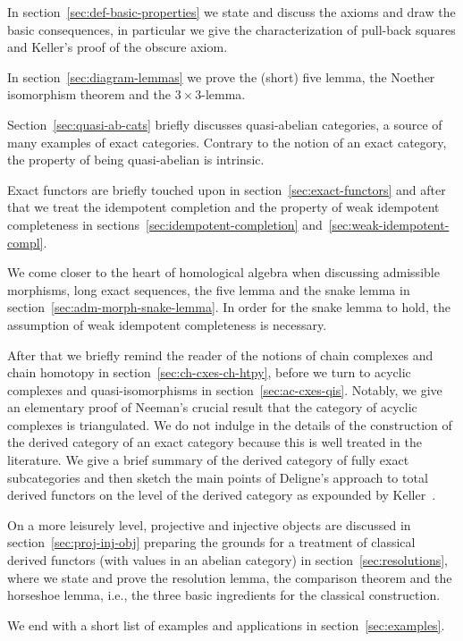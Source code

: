 \documentclass[1p]{elsarticle}
\theoremstyle{mythm}
\theoremstyle{mydef}
\begin{document}
In section~\ref{sec:def-basic-properties} we state and discuss the axioms
and draw the basic consequences, in particular we give the
characterization of pull-back squares and Keller's proof of the
obscure axiom.

In section~\ref{sec:diagram-lemmas} we prove the (short) five lemma,
the Noether isomorphism theorem and the $3\times 3$-lemma.

Section~\ref{sec:quasi-ab-cats} briefly discusses quasi-abelian
categories, a source of many examples of exact categories. Contrary to
the notion of an exact category, the property of being quasi-abelian
is intrinsic.

Exact functors are briefly touched upon in
section~\ref{sec:exact-functors} and after that we treat the
idempotent completion and the property of weak idempotent completeness
in sections~\ref{sec:idempotent-completion}
and~\ref{sec:weak-idempotent-compl}.

We come closer to the heart of homological algebra when discussing
admissible morphisms, long exact sequences, the five lemma and the
snake lemma in section~\ref{sec:adm-morph-snake-lemma}. In order for
the snake lemma to hold, the assumption of
weak idempotent completeness is necessary.

After that we briefly remind the reader of the notions of chain
complexes and chain homotopy in
section~\ref{sec:ch-cxes-ch-htpy}, before we turn to acyclic complexes
and quasi-i\-so\-mor\-phisms in section~\ref{sec:ac-cxes-qis}. Notably, we
give an elementary proof of Neeman's crucial result that the category
of acyclic complexes is triangulated. We do not indulge in the details
of the construction of the derived category of an exact category because
this is well treated in the literature. We give a brief summary of the
derived category of fully exact subcategories and then sketch the
main points of Deligne's approach to total derived functors on the
level of the derived category as expounded by Keller~\cite{MR1421815}.

On a more leisurely level, projective and injective objects are
discussed in section~\ref{sec:proj-inj-obj} preparing the grounds for a
treatment of classical derived functors (with values in an abelian
category) in section~\ref{sec:resolutions}, where we state and prove
the resolution lemma, the comparison theorem and the horseshoe lemma,
i.e., the three basic ingredients for the classical construction.

We end with a short list of examples and applications in
section~\ref{sec:examples}.
\end{document}
